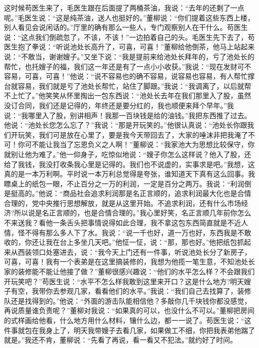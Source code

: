 \documentclass[12pt,oneside]{book}
\begin{document}
这时候苟医生来了，毛医生跟在后面提了两桶茶油，我说：``去年的还剩了一点呢。''毛医生说：``这是纯茶油，送人也挺好的。''董柳说：``你们提着这些东西上楼，别人看见会说闲话的。''厅里的确有那么一些人，专门观察别人在干什么。苟医生说：``这点我们倒疏忽了，不该，不该！''一边拍着自己的头。毛医生先下去了，苟医生抱了拳说：``听说池处长高升了，可喜，可喜！''董柳给他倒茶，他马上站起来说：``不敢当，谢谢嫂子。''又坐下说：``我是提前来给池处长拜年的，亏了池处长的帮忙，也托嫂子的福，我们这一年还是有了一点小小收获。''我说：``现在发财可不容易，可喜，可喜！''他说：``说不容易也的确不容易，说容易也容易，有人帮忙撑台就容易，我们就是亏了池处长帮忙，站住了脚跟。''我说：``我调离了，以后就帮不上忙了。''他笑笑从怀里掏出一包东西说：``池处长去年在我们那里入了股，虽然没订合同，我们还是记得的，年终还是要分红的，我也顺便来拜个早年。''我说：``我哪里入了股，别讲相声！我那一百块钱是给的油钱。''我把东西推了过去。他说：``池处长您怎么忘了？''我说：``那是开玩笑的。''他很认真说：``池处长你跟我们开玩笑，我们可是放在心里了，要是我今天带回去了，大家的唾沫非把我淹了不可！你可不能让我当了忘恩负义之人啊！''董柳说：``我家池大为思想比较保守，你就别让他为难了。''他一仰身子，吃惊似地说：``嫂子你怎么这样说？他入了股，还给了我钱，我没打收条我心里是记得的。我们也不说虚的，实事求是吧。''我想，这真的是一本万利啊。平时说一本万利总觉得是夸张，谁知道天下真有这么回事。我瞟桌上的纸包一眼，不止百分之一万的利润，一定是百分之两万。我说：``利润倒是挺高的。''他说：``商品社会追求利润那是名正言顺的，追求利润最大化也是合情合理的，党中央推行思想解放，就是从这里开始。不追求利润，还有什么市场经济?所以说是名正言顺的，也是合情合理的。''我心里好笑，名正言顺几年前你怎么不来送我？看他一条舌头把事情说得如此合理，我不拿这包东西简直就是不近人情，怪不得有那么多人下了水。我说：``说一千也好，道一万也好，东西我是不敢收的，你还让我在台上多坐几天吧。''他怔一怔，说：``那，那也好。''他把纸包抓起来从西装领口处塞进去，说：``我今天上门还有一件事，听说池处长分了新房子，可喜，可喜！我有一个表弟是在这里搞装修的，我想为他揽一笔生意，不知池处长家的装修能不能让他接了做？''董柳很感兴趣说：``他们的水平怎么样？不会跟我们开玩笑吧？''苟医生说：``水平不怎么样我敢到这里来开口？这是什么地方?明天嫂子有空，我带你去参观几家，看看他们的水平。''我说：``我们自己去找算了，装修队还是找得到的。''他说：``外面的游击队能相信他？多敲你几千块钱你都没感觉，再说质量谁负责呢？''董柳对我说：``如果真的可以，也没什么不可以。''董柳把房间的式样画给他看，什么地方用什么材料，镶什么边，都一一说了。苟医生说：``这件事就包在我身上了，明天我带嫂子去看几家，如果做工不细，你把我表弟他踹了就是。''我还不肯，董柳说：``先看了再说，看一看又不犯法。''就约好了时间。
\end{document}
